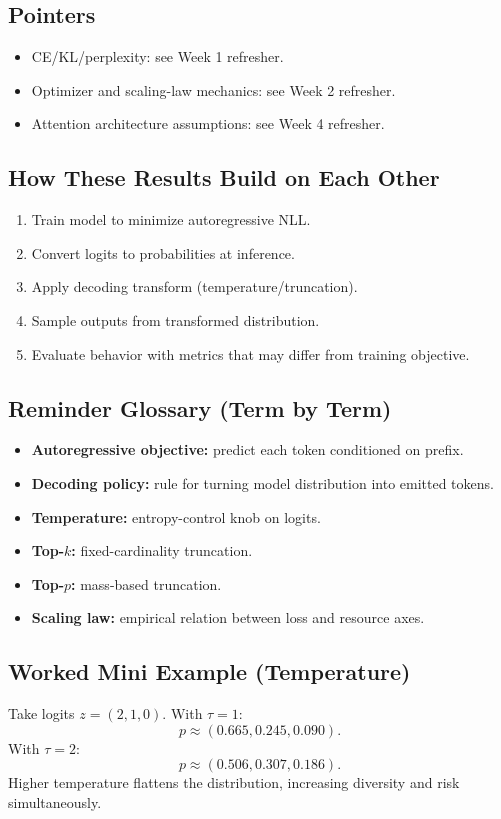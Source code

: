\subsection*{Pointers}
\begin{itemize}[leftmargin=1.5em]
  \item CE/KL/perplexity: see Week 1 refresher.
  \item Optimizer and scaling-law mechanics: see Week 2 refresher.
  \item Attention architecture assumptions: see Week 4 refresher.
\end{itemize}

\subsection*{How These Results Build on Each Other}
\begin{enumerate}[leftmargin=1.5em]
  \item Train model to minimize autoregressive NLL.
  \item Convert logits to probabilities at inference.
  \item Apply decoding transform (temperature/truncation).
  \item Sample outputs from transformed distribution.
  \item Evaluate behavior with metrics that may differ from training objective.
\end{enumerate}

\subsection*{Reminder Glossary (Term by Term)}
\begin{itemize}[leftmargin=1.5em]
  \item \textbf{Autoregressive objective:} predict each token conditioned on prefix.
  \item \textbf{Decoding policy:} rule for turning model distribution into emitted tokens.
  \item \textbf{Temperature:} entropy-control knob on logits.
  \item \textbf{Top-$k$:} fixed-cardinality truncation.
  \item \textbf{Top-$p$:} mass-based truncation.
  \item \textbf{Scaling law:} empirical relation between loss and resource axes.
\end{itemize}

\subsection*{Worked Mini Example (Temperature)}
Take logits $z=(2,1,0)$.
With $\tau=1$:
\[
p\approx(0.665,0.245,0.090).
\]
With $\tau=2$:
\[
p\approx(0.506,0.307,0.186).
\]
Higher temperature flattens the distribution, increasing diversity and risk simultaneously.

